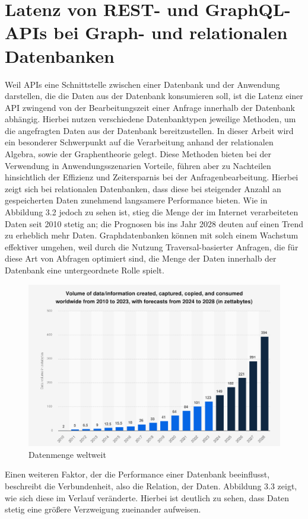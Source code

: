 \section{Latenz von REST- und GraphQL-APIs bei Graph- und relationalen Datenbanken} %
\label{sec:ff2}
Weil APIs eine Schnittstelle zwischen einer Datenbank und der Anwendung darstellen, die die Daten aus der Datenbank konsumieren soll, ist die Latenz einer API zwingend von der Bearbeitungszeit einer Anfrage innerhalb der Datenbank abhängig. Hierbei nutzen verschiedene Datenbanktypen jeweilige Methoden, um die angefragten Daten aus der Datenbank bereitzustellen. In dieser Arbeit wird ein besonderer Schwerpunkt auf die Verarbeitung anhand der relationalen Algebra, sowie der Graphentheorie gelegt. Diese Methoden bieten bei der Verwendung in Anwendungsszenarien Vorteile, führen aber zu Nachteilen hinsichtlich der Effizienz und Zeitersparnis bei der Anfragenbearbeitung. Hierbei zeigt sich bei relationalen Datenbanken, dass diese bei steigender Anzahl an gespeicherten Daten zunehmend langsamere Performance bieten. Wie in Abbildung 3.2 jedoch zu sehen ist, stieg die Menge der im Internet verarbeiteten Daten seit 2010 stetig an; die Prognosen bis ins Jahr 2028 deuten auf einen Trend zu erheblich mehr Daten. Graphdatenbanken können mit solch einem Wachstum effektiver umgehen, weil durch die Nutzung Traversal-basierter Anfragen, die für diese Art von Abfragen optimiert sind, die Menge der Daten innerhalb der Datenbank eine untergeordnete Rolle spielt.  \citep{9677042} \citep{performancenosql}
\begin{figure}[H]
	\centering
	\includegraphics[scale=.4]{Illustrations/growthofdata.png}
	\caption{Datenmenge weltweit \citep{statista}}
\end{figure}
\noindent
Einen weiteren Faktor, der die Performance einer Datenbank beeinflusst, beschreibt die Verbundenheit, also die Relation, der Daten. Abbildung 3.3 zeigt, wie sich diese im Verlauf veränderte. Hierbei ist deutlich zu sehen, dass Daten stetig eine größere Verzweigung zueinander aufweisen.

